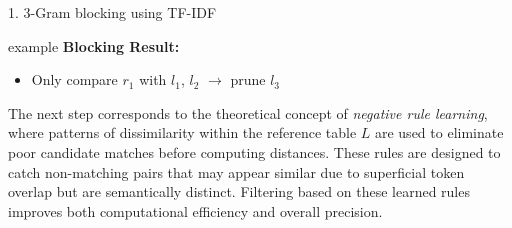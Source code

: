 \documentclass[8pt]{beamer} %
\begin{document}
\begin{frame}{1. 3-Gram blocking using TF-IDF}
\begin{beamercolorbox}[rounded=true, shadow=true, leftskip=1em, rightskip=1em]{example}
		\textbf{Blocking Result:}
		\begin{itemize}
			\item Only compare $r_1$ with $l_1$, $l_2$ $\rightarrow$ prune $l_3$
		\end{itemize}
	\end{beamercolorbox}
	
	
\end{frame}

\begin{frame}
The next step corresponds to the theoretical concept of \textit{negative rule learning}, where patterns of dissimilarity within the reference table $L$ are used to eliminate poor candidate matches before computing distances. These rules are designed to catch non-matching pairs that may appear similar due to superficial token overlap but are semantically distinct. Filtering based on these learned rules improves both computational efficiency and overall precision.

\end{frame}
\end{document}
